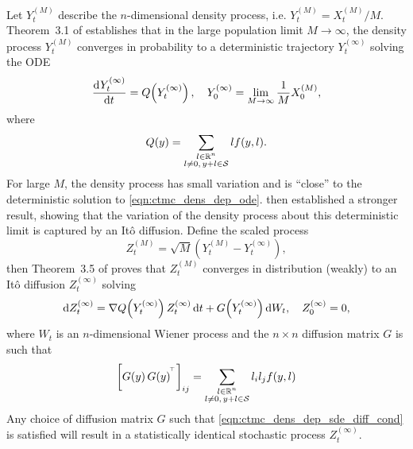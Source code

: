 Let \(Y_t^{(M)}\) describe the \(n\)-dimensional density process, i.e. \(Y_t^{(M)} = X_t^{(M)} / M\).
Theorem~3.1 of \citet{Kurtz_1970_SolutionsOrdinaryDifferential} establishes that in the large population limit \(M \to \infty\), the density process \(Y_t^{(M)}\) converges in probability to a deterministic trajectory \(Y_t^{(\infty)}\) solving the ODE
\begin{equation}
	\dod{Y_t^{(\infty)}}{t} = Q\!\left(Y_t^{(\infty)}\right), \quad Y_0^{(\infty)} = \lim_{M\to\infty}\frac1M X^{(M)}_0,
	\label{eqn:ctmc_dens_dep_ode}
\end{equation}
where
\[
	Q\!\left(y\right) = \sum_{\substack{l \in \mathbb{R}^n \\ l \neq 0,\, y + l \in \mathcal{S}}}{l f\!\left(y, l\right)}.
\]
For large \(M\), the density process has small variation and is ``close'' to the deterministic solution to \cref{eqn:ctmc_dens_dep_ode}.
\citet{Kurtz_1971_LimitTheoremsSequences} then established a stronger result, showing that the variation of the density process about this deterministic limit is captured by an It\^o diffusion.
Define the scaled process
\[
	Z_t^{(M)} = \sqrt{M}\left(Y_t^{(M)} - Y_{t}^{(\infty)}\right),
\]
then Theorem~3.5 of \citet{Kurtz_1971_LimitTheoremsSequences} proves that \(Z_t^{(M)}\) converges in distribution (weakly) to an It\^o diffusion \(Z_t^{(\infty)}\) solving
\begin{equation}
	\dif Z_t^{(\infty)} = \nabla Q\!\left(Y_t^{(\infty)}\right) Z_t^{(\infty)}\dif t + G\!\left(Y_t^{(\infty)}\right)\dif W_t, \quad Z_0^{(\infty)} = 0,
	\label{eqn:ctmc_dens_dep_sde}
\end{equation}
where \(W_t\) is an \(n\)-dimensional Wiener process and the \(n \times n\) diffusion matrix \(G\) is such that
\begin{equation}
	\left[G\!\left(y\right)G\!\left(y\right)^{^{\!\top}}\right]_{ij} = \sum_{\substack{l \in \mathbb{R}^n \\ l \neq 0,\, y + l \in \mathcal{S}}}{l_i l_j f\!\left(y,l\right)}
	\label{eqn:ctmc_dens_dep_sde_diff_cond}
\end{equation}
Any choice of diffusion matrix \(G\) such that \cref{eqn:ctmc_dens_dep_sde_diff_cond} is satisfied will result in a statistically identical stochastic process \(Z_t^{(\infty)}\).



